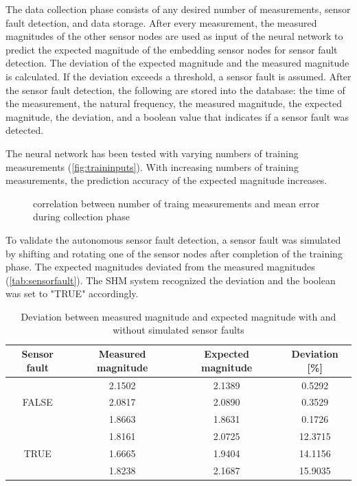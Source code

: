 \documentclass[12pt,a4paper]{scrartcl}
\begin{document}
The data collection phase consists of any desired number of measurements, sensor fault detection, and data storage.
After every measurement, the measured magnitudes of the other sensor nodes are used as input of the neural network to predict the expected magnitude of the embedding sensor nodes for sensor fault detection.
The deviation of the expected magnitude and the measured magnitude is calculated.
If the deviation exceeds a threshold, a sensor fault is assumed.
After the sensor fault detection, the following are stored into the database: the time of the measurement, the natural frequency, the measured magnitude, the expected magnitude, the deviation,  and a boolean value that indicates if a sensor fault was detected.

The neural network has been tested with varying numbers of training measurements (\autoref{fig:traininputs}).
With increasing numbers of training measurements, the prediction accuracy of the expected magnitude increases.

\begin{figure}[htb]
    \centering
    \caption{correlation between number of traing measurements and mean error during collection phase}
    \label{fig:traininputs}
\end{figure}

To validate the autonomous sensor fault detection, a sensor fault was simulated by shifting and rotating one of the sensor nodes after completion of the training phase.
The expected magnitudes deviated from the measured magnitudes (\autoref{tab:sensorfault}).
The SHM system recognized the deviation and the boolean was set to "TRUE" accordingly.

\begin{table}[hb]
	\centering
	\caption{Deviation between measured magnitude and expected magnitude with and without simulated sensor faults}
	\begin{tabular}{c c c c}
		\toprule
		Sensor fault & Measured magnitude & Expected magnitude & Deviation [\%]\\ 
		\midrule
		  & 2.1502 & 2.1389 & 0.5292 \\
		FALSE & 2.0817 & 2.0890 & 0.3529 \\
		  & 1.8663 & 1.8631 & 0.1726 \\
		\midrule	
		 & 1.8161 & 2.0725 & 12.3715\\
		TRUE & 1.6665 & 1.9404 & 14.1156\\
		 & 1.8238 & 2.1687 & 15.9035\\
		\bottomrule
	\end{tabular}
	\label{tab:sensorfault}
\end{table}
\end{document}
